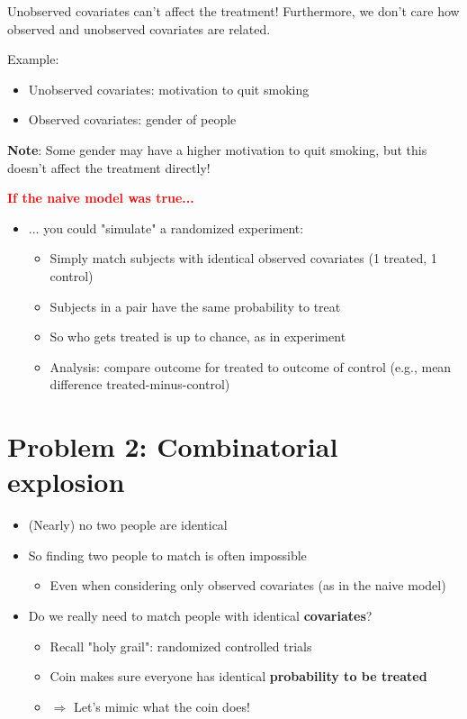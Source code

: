 \documentclass[11pt]{article}
\begin{document}
Unobserved covariates can't affect the treatment! Furthermore, we don't care how observed and unobserved covariates are related.  

Example: 
\begin{itemize}
	\item Unobserved covariates: motivation to quit smoking
	\item Observed covariates: gender of people
\end{itemize}

\textbf{Note}: Some gender may have a higher motivation to quit smoking, but this doesn't affect the treatment directly! 

\textbf{\textcolor{red}{If the naive model was true...}}

\begin{itemize}
	\item ... you could "simulate" a randomized experiment:
		\begin{itemize}
			\item Simply match subjects with identical observed covariates (1 treated, 1 control) 
			\item Subjects in a pair have the same probability to treat 
			\item So who gets treated is up to chance, as in experiment
			\item Analysis: compare outcome for treated to outcome of control (e.g., mean difference treated-minus-control)
		\end{itemize}
\end{itemize}

\section*{Problem 2: Combinatorial explosion}

\begin{itemize}
	\item (Nearly) no two people are identical
	\item So finding two people to match is often impossible
		\begin{itemize}
			\item Even when considering only observed covariates (as in the naive model)
		\end{itemize}
	\item Do we really need to match people with identical \textbf{covariates}?
	\begin{itemize}
		\item Recall "holy grail": randomized controlled trials
		\item Coin makes sure everyone has identical \textbf{probability to be treated}
		\item  $\Rightarrow$ Let's mimic what the coin does!
	\end{itemize}
\end{itemize}
\end{document}
